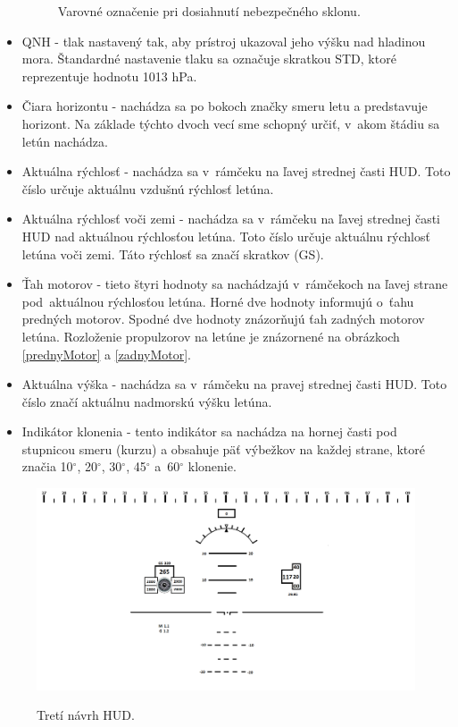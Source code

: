 \begin{itemize}
\begin{figure}[ht]
\caption{Varovné označenie pri dosiahnutí nebezpečného sklonu.}{\label{warning}}
\end{figure}
    \item QNH - tlak nastavený tak, aby prístroj ukazoval jeho výšku nad hladinou mora. Štandardné nastavenie tlaku sa označuje skratkou STD, ktoré reprezentuje hodnotu 1013 hPa.
    \item Čiara horizontu - nachádza sa po bokoch značky smeru letu a predstavuje horizont. Na základe týchto dvoch vecí sme schopný určiť, v~akom štádiu sa letún nachádza. 
    \item Aktuálna rýchlosť - nachádza sa v~rámčeku na ľavej strednej časti HUD. Toto číslo určuje aktuálnu vzdušnú rýchlosť letúna.
    \item Aktuálna rýchlosť voči zemi - nachádza sa v~rámčeku na ľavej strednej časti HUD nad aktuálnou rýchlosťou letúna. Toto číslo určuje aktuálnu rýchlosť letúna voči zemi. Táto rýchlosť sa značí skratkov (GS).
    \item Ťah motorov - tieto štyri hodnoty sa nachádzajú v~rámčekoch na ľavej strane pod~aktuálnou rýchlosťou letúna. Horné dve hodnoty informujú o~ťahu predných motorov. Spodné dve hodnoty znázorňujú ťah zadných motorov letúna. Rozloženie propulzorov na letúne je znázornené na obrázkoch \ref{prednyMotor} a \ref{zadnyMotor}.
    \item Aktuálna výška - nachádza sa v~rámčeku na pravej strednej časti HUD. Toto číslo značí aktuálnu nadmorskú výšku letúna.
    \item Indikátor klonenia - tento indikátor sa nachádza na hornej časti pod stupnicou smeru (kurzu) a obsahuje päť výbežkov na každej strane, ktoré značia 10$^\circ$, 20$^\circ$, 30$^\circ$, 45$^\circ$ a~60$^\circ$ klonenie.
\end{itemize}
\begin{figure}[ht]
\centering
\includegraphics[scale=0.3]{obrazky-figures/finalHUDf.png}
\caption{Tretí návrh HUD.}{\label{finalHUD}}
\end{figure}

